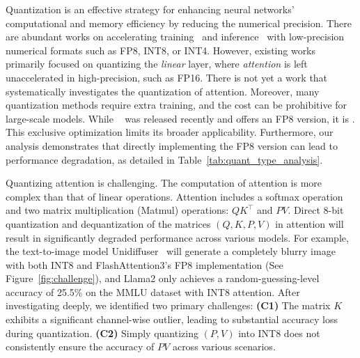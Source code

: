 Quantization is an effective strategy for enhancing neural networks' computational and memory efficiency by reducing the numerical precision. There are abundant works on accelerating training~\citep{sun2019hybrid,xijetfire,peng2023fp8} and inference~\citep{jacob2018quantization,xiao2023smoothquant} with low-precision numerical formats such as FP8, INT8, or INT4. However, existing works primarily focused on quantizing the \emph{linear} layer, where \emph{attention} is left unaccelerated in high-precision, such as FP16. There is not yet a work that systematically investigates the quantization of attention. 
Moreover, many quantization methods require extra training, and the cost can be prohibitive for large-scale models. 
While ~\citep{shah2024flashattention} was released recently and offers an FP8 version, it is . This exclusive optimization limits its broader applicability. Furthermore, our analysis demonstrates that directly implementing the FP8 version can lead to performance degradation, as detailed in Table~\ref{tab:quant_type_analysis}.



Quantizing attention is challenging. The computation of attention is more complex than that of linear operations. Attention includes a softmax operation and two matrix multiplication (Matmul) operations: $QK^\top$ and $PV$. Direct 8-bit quantization and dequantization of the matrices $(Q, K, P, V)$ in attention will result in significantly degraded performance across various models. For example, the text-to-image model Unidiffuser~\citep{bao2022uni} will generate a completely blurry image with both INT8 and FlashAttention3's FP8 implementation (See Figure~\ref{fig:challenge}), and Llama2 only achieves a random-guessing-level accuracy of 25.5\% on the MMLU dataset with INT8 attention. After investigating deeply, we identified two primary challenges: 
\textbf{(C1)} The matrix $K$ exhibits a significant channel-wise outlier, leading to substantial accuracy loss during quantization.
\textbf{(C2)} Simply quantizing $(P, V)$ into INT8 does not consistently ensure the accuracy of $PV$ across various scenarios.

